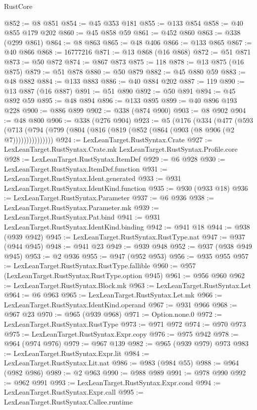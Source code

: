\begin{lexlean}{RustCore}
\begin{coremodule}
@852 := @8 @851
@854 := @45 @353 @181
@855 := @133 @854
@858 := @40 @855 @179 @202
@860 := @45 @858 @59
@861 := @452 @860
@863 := @338 (@299 @861)
@864 := @8 @863
@865 := @48 @406
@866 := @133 @865
@867 := @40 @866
@868 := 16777216
@871 := @13 @868 (@16 @868)
@872 := @51 @871
@873 := @50 @872
@874 := @867 @873
@875 := 118
@878 := @13 @875 (@16 @875)
@879 := @51 @878
@880 := @50 @879
@882 := @45 @880 @59
@883 := @48 @882
@884 := @133 @883
@886 := @40 @884 @202
@887 := 119
@890 := @13 @887 (@16 @887)
@891 := @51 @890
@892 := @50 @891
@894 := @45 @892 @59
@895 := @48 @894
@896 := @133 @895
@899 := @40 @896 @193 @228
@900 := @886 @899
@902 := @338 (@874 @900)
@903 := @8 @902
@904 := @48 @800
@906 := @338 (@276 @904)
@923 := @5
    (@176
      (@334
        (@477
          (@593 (@713 (@794 (@799 (@804 (@816 (@819 (@852 (@864 (@903 (@8 @906 (@2 @7)))))))))))))))
@924 := LexLeanTarget.RustSyntax.Crate
@927 := LexLeanTarget.RustSyntax.Crate.mk LexLeanTarget.RustSyntax.Profile.core
@928 := LexLeanTarget.RustSyntax.ItemDef
@929 := @6 @928
@930 := LexLeanTarget.RustSyntax.ItemDef.function
@931 := LexLeanTarget.RustSyntax.Ident.generated
@933 := @931 LexLeanTarget.RustSyntax.IdentKind.function
@935 := @930 (@933 @18)
@936 := LexLeanTarget.RustSyntax.Parameter
@937 := @6 @936
@938 := LexLeanTarget.RustSyntax.Parameter.mk
@939 := LexLeanTarget.RustSyntax.Pat.bind
@941 := @931 LexLeanTarget.RustSyntax.IdentKind.binding
@942 := @941 @18
@944 := @938 (@939 @942)
@945 := LexLeanTarget.RustSyntax.RustType.nat
@947 := @937 (@944 @945)
@948 := @941 @23
@949 := @939 @948
@952 := @937 (@938 @949 @945)
@953 := @2 @936
@955 := @947 (@952 @953)
@956 := @935 @955
@957 := LexLeanTarget.RustSyntax.RustType.fallible
@960 := @957 (LexLeanTarget.RustSyntax.RustType.option @945)
@961 := @956 @960
@962 := LexLeanTarget.RustSyntax.Block.mk
@963 := LexLeanTarget.RustSyntax.Let
@964 := @6 @963
@965 := LexLeanTarget.RustSyntax.Let.mk
@966 := LexLeanTarget.RustSyntax.IdentKind.operand
@967 := @931 @966
@968 := @967 @23
@970 := @965 (@939 @968)
@971 := Option.none.{0}
@972 := LexLeanTarget.RustSyntax.RustType
@973 := @971 @972
@974 := @970 @973
@975 := LexLeanTarget.RustSyntax.Expr.copy
@976 := @975 @942
@978 := @964 (@974 @976)
@979 := @967 @139
@982 := @965 (@939 @979) @973
@983 := LexLeanTarget.RustSyntax.Expr.lit
@984 := LexLeanTarget.RustSyntax.Lit.nat
@986 := @983 (@984 @55)
@988 := @964 (@982 @986)
@989 := @2 @963
@990 := @988 @989
@991 := @978 @990
@992 := @962 @991
@993 := LexLeanTarget.RustSyntax.Expr.cond
@994 := LexLeanTarget.RustSyntax.Expr.call
@995 := LexLeanTarget.RustSyntax.Callee.runtime

\end{coremodule}
\end{lexlean}
